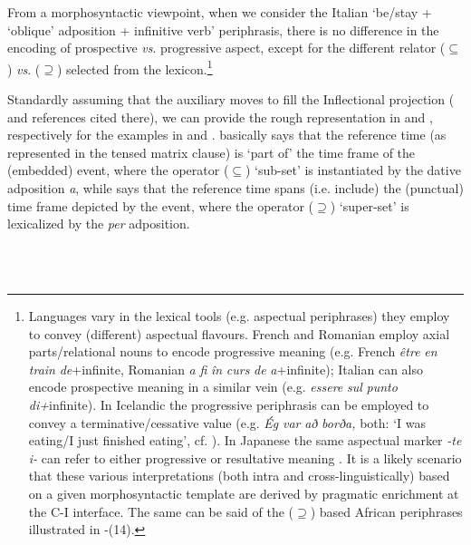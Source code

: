 \documentclass[output=paper]{langsci/langscibook}
\begin{document}
From a morphosyntactic viewpoint, when we consider the Italian ‘be/stay + ‘oblique’ adposition + infinitive verb’ periphrasis, there is no difference in the encoding of prospective \textit{vs}. progressive aspect, except for the different relator  (${\subseteq}$) \textit{vs}. (${\supseteq}$) selected from the lexicon.\footnote{Languages vary in the lexical tools (e.g. aspectual periphrases) they employ to convey (different) aspectual flavours. French and Romanian employ axial parts/relational nouns \citep{Svenonius2006} to encode progressive meaning (e.g. French \textit{être} \textit{en} \textit{train} \textit{de}+infinite, Romanian \textit{a} \textit{fi} \textit{în} \textit{curs} \textit{de} \textit{a}+infinite); Italian can also encode prospective meaning in a similar vein (e.g. \textit{essere} \textit{sul} \textit{punto} \textit{di+}infinite).  In Icelandic the progressive periphrasis can be employed to convey a terminative/cessative value (e.g. \textit{Ég} \textit{var} \textit{að} \textit{borða,} both: ‘I was eating/I just finished eating’, cf. \citealt{Jóhannsdóttir2012}). In Japanese the same aspectual marker \textit{{}-te i-} can refer to either progressive or resultative meaning \citep{Shirai1998}. It is a likely scenario that these various interpretations (both intra and cross-linguistically) based on a given morphosyntactic template are derived by pragmatic enrichment at the C-I interface. The same can be said of the (\textrm{${\supseteq}$}) based African periphrases illustrated in -(14).} 

Standardly assuming that the auxiliary moves to fill the Inflectional projection (\citealt{ManziniEtAl2017} and references cited there), we can provide the rough representation in  and , respectively for the examples in  and .  basically says that the reference time (as represented in the tensed matrix clause) is ‘part of’ the time frame of the (embedded) event, where the operator (${\subseteq}$) ‘sub-set’  is instantiated by the dative adposition \textit{a}, while  says that the reference time spans (i.e. include) the (punctual) time frame depicted by the event, where the operator (${\supseteq}$) ‘super-set’ is lexicalized by the \textit{per} adposition.

\ea%
    \label{ex:key:25}
    \gll\\
        \\
    \glt
    \z
\end{document}
